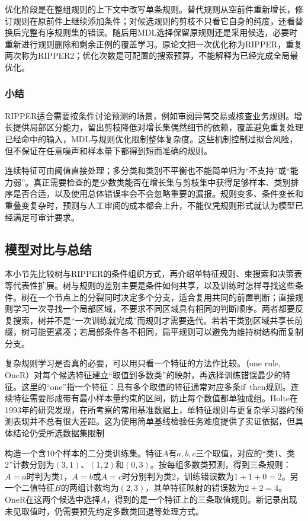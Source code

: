 优化阶段是在整组规则的上下文中改写单条规则。替代规则从空前件重新增长，修订规则在原前件上继续添加条件；对候选规则的剪枝不只看它自身的纯度，还看替换后完整有序规则集的错误。随后用MDL选择保留原规则还是采用候选，必要时重新进行规则删除和剩余正例的覆盖学习。原论文把一次优化称为RIPPER，重复两次称为RIPPER2；优化次数是可配置的搜索预算，不能解释为已经完成全局最优化。

\subsubsection{小结}
\label{sec:classification-ripper-summary}

RIPPER适合需要按条件讨论预测的场景，例如审阅异常交易或核查业务规则。增长提供局部区分能力，留出剪枝降低对增长集偶然细节的依赖，覆盖避免重复处理已经命中的输入，MDL与规则优化限制整体复杂度。这些机制控制过拟合风险，但不保证在任意噪声和样本量下都得到短而准确的规则。

连续特征可由阈值直接处理；多分类和类别不平衡也不能简单归为“不支持”或“能力弱”。真正需要检查的是少数类能否在增长集与剪枝集中获得足够样本、类别排序是否合适，以及使用总体错误率会不会忽略重要的漏报。规则变多、条件变长和重叠变复杂时，预测与人工审阅的成本都会上升，不能仅凭规则形式就认为模型已经满足可审计要求。

\subsection{模型对比与总结}
\label{sec:classification-rules-comparison}

本小节先比较树与RIPPER的条件组织方式，再介绍单特征规则、束搜索和决策表等代表性扩展。树与规则的差别主要是条件如何共享，以及训练时怎样寻找这些条件。树在一个节点上的分裂同时决定多个分支，适合复用共同的前置判断；直接规则学习一次寻找一个局部区域，不要求不同区域具有相同的判断顺序。两者都要反复搜索，树并不是“一次训练就完成”而规则才需要迭代。若若干类别区域共享长前缀，树可能更紧凑；若局部条件各不相同，扁平规则可以避免为维持树结构而复制分支。

复杂规则学习是否真的必要，可以用只看一个特征的方法作比较。（one rule, OneR）对每个候选特征建立“取值到多数类”的映射，再选择训练错误最少的特征。这里的“one”指一个特征：具有多个取值的特征通常对应多条if--then规则。连续特征需要形成带有最小样本量约束的区间，防止每个数值都单独成组。Holte在1993年的研究发现，在所考察的常用基准数据上，单特征规则与更复杂学习器的预测表现并不总有很大差距。这为使用简单基线检验任务难度提供了实证依据，但具体结论仍受所选数据集限制

\begin{example}[一个特征可以产生多条规则]
  \label{ex:classification-oner}
  构造一个含10个样本的二分类训练集。特征$A$有$a,b,c$三个取值，对应的“类1、类2”计数分别为$(3,1)$、$(1,2)$和$(0,3)$。按每组多数类预测，得到三条规则：$A=a$时判为类1，$A=b$或$A=c$时分别判为类2，训练错误数为$1+1+0=2$。另一个二值特征$B$的两组计数均为$(2,3)$，其单特征映射的错误数为$2+2=4$。OneR在这两个候选中选择$A$，得到的是一个特征上的三条取值规则。新记录出现未见取值时，仍需要预先约定多数类回退等处理方式。
\end{example}

